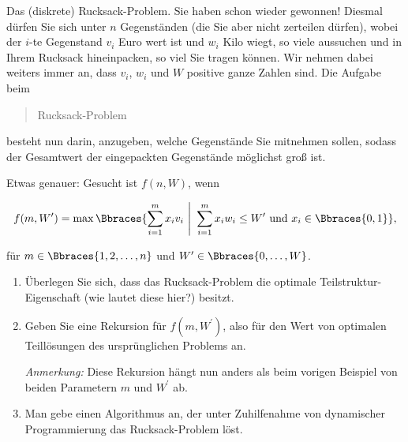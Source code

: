 
\begin{exercise}

Das (diskrete) Rucksack-Problem.
Sie haben schon wieder gewonnen!
Diesmal dürfen Sie sich unter $n$ Gegenständen (die Sie aber nicht zerteilen dürfen), wobei der $i$-te Gegenstand $v_i$ Euro wert ist und $w_i$ Kilo wiegt, so viele aussuchen und in Ihrem Rucksack hineinpacken, so viel Sie tragen können.
Wir nehmen dabei weiters immer an, dass $v_i$, $w_i$ und $W$ positive ganze Zahlen sind.
Die Aufgabe beim \blockquote{Rucksack-Problem} besteht nun darin, anzugeben, welche Gegenstände Sie mitnehmen sollen, sodass der Gesamtwert der eingepackten Gegenstände möglichst groß ist.

Etwas genauer:
Gesucht ist $f(n, W)$, wenn

\begin{align*}
  f(m, W^\prime)
  =
  \max
  \Bbraces
  {
    \sum_{i=1}^m
      x_i v_i
    ~\Bigg |~
    \sum_{i=1}^m
      x_i w_i
    \leq
    W^\prime
    ~\text{und}~
    x_i \in \Bbraces{0, 1}
  },
\end{align*}

für $m \in \Bbraces{1, 2, \dots, n}$ und $W^\prime \in \Bbraces{0, \dots, W}$.

\begin{enumerate}[label = \alph*]

  \item Überlegen Sie sich, dass das Rucksack-Problem die optimale Teilstruktur-Eigenschaft (wie lautet diese hier?) besitzt.

  \item Geben Sie eine Rekursion für $f(m, W^\prime)$, also für den Wert von optimalen Teillösungen des ursprünglichen Problems an.

  \textit{Anmerkung:}
  Diese Rekursion hängt nun anders als beim vorigen Beispiel von beiden Parametern $m$ und $W^\prime$ ab.

  \item Man gebe einen Algorithmus an, der unter Zuhilfenahme von dynamischer Programmierung das Rucksack-Problem löst.

\end{enumerate}

\end{exercise}



